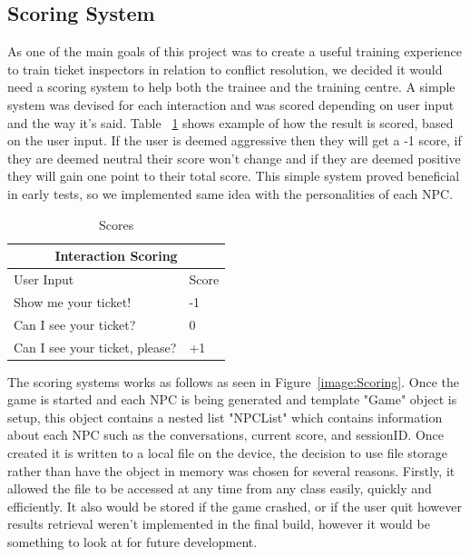 \subsection{Scoring System}
As one of the main goals of this project was to create a useful training experience to train ticket inspectors in relation to conflict resolution, we decided it would need a scoring system to help both the trainee and the training centre. A simple system was devised for each interaction and was scored depending on user input and the way it's said. Table ~\ref{tab:scores} shows example of how the result is scored, based on the user input. If the user is deemed aggressive then they will get a -1 score, if they are deemed neutral their score won't change and if they are deemed positive they will gain one point to their total score. This simple system proved beneficial in early tests, so we implemented same idea with the personalities of each NPC.

\begin{table}[!ht]
    \centering
\begin{tabular}{ |p{6cm}|p{2cm}|  }
\hline
\multicolumn{2}{|c|}{Interaction Scoring} \\
\hline
User Input & Score \\
\hline
Show me your ticket! & -1 \\
\hline
Can I see your ticket? & 0 \\
\hline
Can I see your ticket, please? & +1 \\
\hline

\end{tabular}
    \caption{Scores}
    \label{tab:scores}
\end{table}

The scoring systems works as follows as seen in Figure~\ref{image:Scoring}. Once the game is started and each NPC is being generated and template "Game" object is setup, this object contains a nested list "NPCList" which contains information about each NPC such as the conversations, current score, and sessionID. Once created it is written to a local file on the device, the decision to use file storage rather than have the object in memory was chosen for several reasons. Firstly, it allowed the file to be accessed at any time from any class easily, quickly and efficiently. It also would be stored if the game crashed, or if the user quit however results retrieval weren't implemented in the final build, however it would be something to look at for future development.

\par
\medskip

